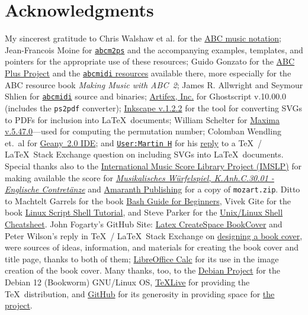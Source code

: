 \documentclass[letterpaper,x11names,svgnames,10pt]{article}
\begin{document}
\section{Acknowledgments}
My sincerest gratitude to Chris Walshaw et al. for the \href{http://www.abcnotation.com/}{ABC music notation}; Jean-Francois Moine for \href{http://moinejf.free.fr/}{\tt abcm2ps} and the accompanying examples, templates, and pointers for the appropriate use of these resources; Guido Gonzato for the \href{http://abcplus.sourceforge.net/}{ABC Plus Project} and the \href{http://abcplus.sourceforge.net/#abcMIDI}{{\tt abcmidi} resources} available there, more especially for the ABC resource book {\em Making Music with ABC~2}; James R. Allwright and Seymour Shlien for \href{http://abc.sourceforge.net/abcMIDI}{\tt abcmidi} source and binaries; \href{https://artifex.com/}{Artifex, Inc.} for Ghostscript v.10.00.0 (includes the {\tt ps2pdf} converter); \href{https://www.inkscape.org/}{Inkscape v.1.2.2} for the tool for converting SVGs to PDFs for inclusion into \LaTeX\ documents; William Schelter for \href{https://maxima.sourceforge.io}{Maxima v.5.47.0}---used for computing the permutation number; Colomban Wendling et.\ al for \href{https://www.geany.org}{Geany~2.0 IDE}; and \href{https://tex.stackexchange.com/users/632/martin-h}{\tt User:Martin H} for his \href{https://tex.stackexchange.com/questions/2099/how-to-include-svg-diagrams-in-latex}{reply} to a \TeX\ / \LaTeX\ Stack Exchange question on including SVGs into \LaTeX\ documents. Special thanks also to the \href{http://imslp.org/}{International Music Score Library Project (IMSLP)} for making available the score for \href{https://imslp.org/wiki/Musikalische_W\%C3\%BCrfelspiele\%2C_K.Anh.C.30.01_(Mozart\%2C_Wolfgang_Amadeus)}{\em Musikalisches W\"{u}rfelspiel, K.Anh.C.30.01 - Englische Contret\"{a}nze} and \href{http://www.amaranthpublishing.com/MozartDiceGame.htm}{Amaranth Publishing} for a copy of {\tt mozart.zip}. Ditto to Machtelt Garrels for the book \href{http://tldp.org/LDP/Bash-Beginners-Guide/html/Bash-Beginners-Guide.html}{Bash Guide for Beginners}, Vivek Gite for the book \href{http://www.freeos.com/guides/lsst/}{Linux Script Shell Tutorial}, and Steve Parker for the \href{http://steve-parker.org/sh/cheatsheet.pdf}{Unix/Linux Shell Cheatsheet}. John Fogarty's GitHub Site: \href{https://github.com/jfogarty/latex-createspace-bookcover}{Latex CreateSpace BookCover} and Peter Wilson's reply in \TeX\ / \LaTeX\ Stack Exchange on \href{https://tex.stackexchange.com/questions/17579/how-can-i-design-a-book-cover}{designing a book cover}, were sources of ideas, information, and materials for creating the book cover and title page, thanks to both of them; \href{http://www.libreoffice.org/}{LibreOffice Calc} for its use in the image creation of the book cover.  Many thanks, too, to the \href{https://www.debian.org}{Debian Project} for the Debian 12 (Bookworm) GNU/Linux OS, \href{http://www.tug.org/texlive/}{TeXLive} for providing the \TeX\ distribution,  and \href{https://github.com}{GitHub} for its generosity in providing space for \href{https://github.com/justineuro/mdgBookSVG1ecdKit}{the project}.  
\end{document}
